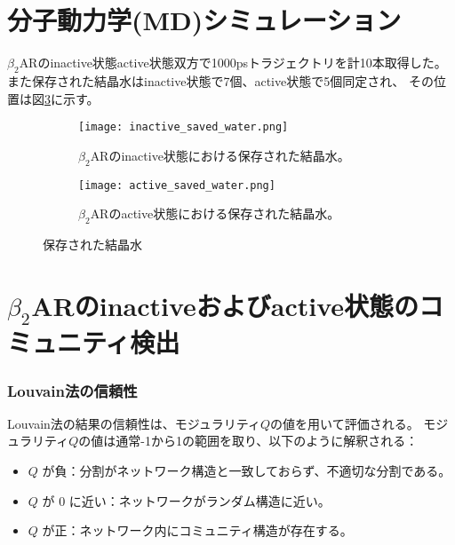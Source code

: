 \section{分子動力学(MD)シミュレーション}

$\beta_2$ARのinactive状態active状態双方で1000psトラジェクトリを計10本取得した。
また保存された結晶水はinactive状態で7個、active状態で5個同定され、
その位置は図\ref{fig:water-all}に示す。

\begin{figure}[htbp]
    \centering
    \begin{subfigure}{0.45\textwidth} %
      \centering
      \texttt{[image: inactive\_saved\_water.png]}
      \caption{$\beta_2$ARのinactive状態における保存された結晶水。}
      \label{fig:inactive_water}
    \end{subfigure}
    \hspace{0.05\textwidth} %
    \begin{subfigure}{0.45\textwidth}
      \centering
      \texttt{[image: active\_saved\_water.png]}
      \caption{$\beta_2$ARのactive状態における保存された結晶水。}
      \label{fig:active_water}
    \end{subfigure}
    \caption{保存された結晶水}
    \label{fig:water-all}
  \end{figure}

\newpage

\section{$\beta_2$ARのinactiveおよびactive状態のコミュニティ検出}

\subsubsection{Louvain法の信頼性}

Louvain法の結果の信頼性は、モジュラリティ$Q$の値を用いて評価される。
モジュラリティ$Q$の値は通常-1から1の範囲を取り、以下のように解釈される：

\begin{itemize}
    \item \( Q \) が負：分割がネットワーク構造と一致しておらず、不適切な分割である。
    \item \( Q \) が 0 に近い：ネットワークがランダム構造に近い。
    \item \( Q \) が正：ネットワーク内にコミュニティ構造が存在する。
\end{itemize}

